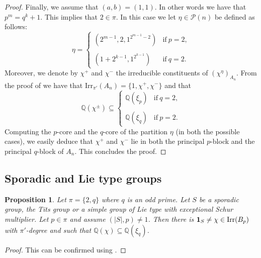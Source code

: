 \documentclass[a4paper,12pt,leqno]{amsart}
\def\sbs{\subseteq}
\newcommand{\6}{^}
\newcommand{\Irr}{\operatorname{Irr}}
\newtheorem{prop}[subsection]{Proposition}
\theoremstyle{definition}
\theoremstyle{definition}
\theoremstyle{definition}
\theoremstyle{definition}
\theoremstyle{definition}
\begin{document}
\begin{proof}
Finally, we assume that $(a,b)=(1,1)$. In other words we have that $p\6m=q\6k+1$. This implies that $2\in\pi$. 
In this case we let $\eta\in\mathcal{P}(n)$ be defined as follows:
$$\eta=\begin{cases} (2\6{m-1}, 2, 1\6{2\6{m-1}-2}) & \mathrm{if}\ p=2,\\
\\
(1+2\6{k-1}, 1\6{2\6{k-1}}) & \mathrm{if}\ q=2.
\end{cases}
$$
Moreover, we denote by $\chi\6+$ and $\chi\6-$ the irreducible constituents of $(\chi^\eta)_{A_n}$. 
From the proof of \cite[Theorem D]{GHSV21} we have that $\mathrm{Irr}_{\pi'}(A_n)=\{1, \chi\6+, \chi\6-\}$ and that 
$$\mathbb{Q}(\chi\6\pm)\subseteq\begin{cases} \mathbb{Q}(\xi_p) & \mathrm{if}\ q=2,\\
\\
\mathbb{Q}(\xi_q) & \mathrm{if}\ p=2.
\end{cases}
$$
Computing the $p$-core and the $q$-core of the partition $\eta$ (in both the possible cases), we easily deduce that $\chi\6+$ and $\chi\6-$ lie in both the principal $p$-block and the principal $q$-block of $A_n$. This concludes the proof. 
\end{proof}

 
 
 \subsection{Sporadic and Lie type groups}

 \begin{prop}\label{prop:simple-exceptions} Let $\pi=\{ 2, q\}$ where $q$ is an odd prime.
 Let $S$ be a sporadic group, the Tits group or a simple group of Lie type with exceptional Schur multiplier.  Let $p\in\pi$  and assume $(|S|,p)\neq 1$. Then there is ${\bf 1}_S\neq \chi\in\Irr(B_p)$ with $\pi'$-degree and such that $\mathbb{Q}(\chi)\sbs\mathbb{Q}(\xi_q)$.
 \end{prop}
 \begin{proof} This can be confirmed using \cite{GAP}.
 \end{proof}
\end{document}
